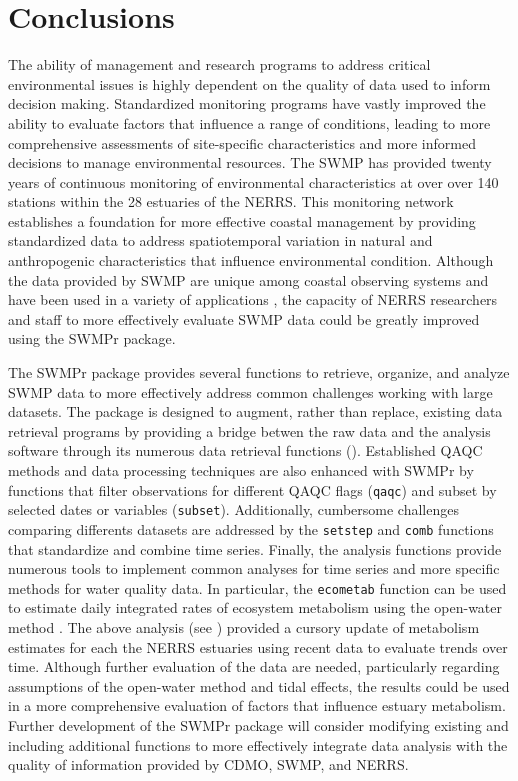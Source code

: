 \documentclass[10pt,letterpaper]{article}\usepackage[]{graphicx}\usepackage[]{color}
\begin{document}
\section*{Conclusions}

The ability of management and research programs to address critical environmental issues is highly dependent on the quality of data used to inform decision making.  Standardized monitoring programs have vastly improved the ability to evaluate factors that influence a range of conditions, leading to more comprehensive assessments of site-specific characteristics and more informed decisions to manage environmental resources.  The \acrlong{SWMP} has provided twenty years of continuous monitoring of environmental characteristics at over over 140 stations within the 28 estuaries of the \acrlong{NERRS}.  This monitoring network establishes a foundation  for more effective coastal management by providing standardized data to address spatiotemporal variation in natural and anthropogenic characteristics that influence environmental condition.  Although the data provided by \gls{SWMP} are unique among coastal observing systems and have been used in a variety of applications \cite{Bulthius95,Caffrey03,Sanger02,Wenner04,Dix08}, the capacity of \gls{NERRS} researchers and staff to more effectively evaluate \gls{SWMP} data could be greatly improved using the SWMPr package.

The SWMPr package provides several functions to retrieve, organize, and analyze \gls{SWMP} data to more effectively address common challenges working with large datasets.  The package is designed to augment, rather than replace, existing data retrieval programs by providing a bridge betwen the raw data and the analysis software through its numerous data retrieval functions ().  Established \gls{QAQC} methods and data processing techniques are also enhanced with SWMPr by functions that filter observations for different \gls{QAQC} flags (\texttt{qaqc}) and subset by selected dates or variables (\texttt{subset}).  Additionally, cumbersome challenges comparing differents datasets are addressed by the \texttt{setstep} and \texttt{comb} functions that standardize and combine time series.  Finally, the analysis functions provide numerous tools to implement common analyses for time series and more specific methods for water quality data.  In particular, the \texttt{ecometab} function can be used to estimate daily integrated rates of ecosystem metabolism using the open-water method \cite{Odum56,Caffrey14}.  The above analysis (see ) provided a cursory update of metabolism estimates for each the \gls{NERRS} estuaries using recent data to evaluate trends over time.  Although further evaluation of the data are needed, particularly regarding assumptions of the open-water method and tidal effects, the results could be used in a more comprehensive evaluation of factors that influence estuary metabolism. Further development of the SWMPr package will consider modifying existing and including additional functions to more effectively integrate data analysis with the quality of information provided by \gls{CDMO}, \gls{SWMP}, and \gls{NERRS}. 
\end{document}
